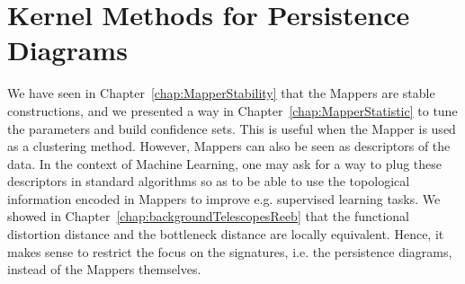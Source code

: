 \chapter{Kernel Methods for Persistence Diagrams}
\label{chap:LearningPDs}





We have seen in Chapter~\ref{chap:MapperStability} that the Mappers are stable constructions, 
and we presented a way in Chapter~\ref{chap:MapperStatistic} to tune the parameters and build confidence sets. 
This is useful when the Mapper is used as a clustering method.
However, Mappers can also be seen as descriptors of the data.
In the context of Machine Learning, one may ask for a way to plug these descriptors in 
standard algorithms so as to be able to use the topological information encoded in 
Mappers to improve e.g. supervised learning tasks. We showed in Chapter~\ref{chap:backgroundTelescopesReeb}
that the functional distortion distance and the bottleneck distance are locally equivalent.
Hence, it makes sense to restrict the focus on the signatures, i.e. the persistence diagrams, instead of the Mappers themselves.

